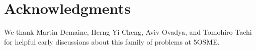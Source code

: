 \documentclass[10pt,twoside]{article}
\begin{document}
\maketitle

%









\section*{Acknowledgments}

We thank Martin Demaine, Herng Yi Cheng, Aviv Ovadya, and Tomohiro Tachi
for helpful early discussions about this family of problems at 5OSME.




\theaffiliations
\end{document}

